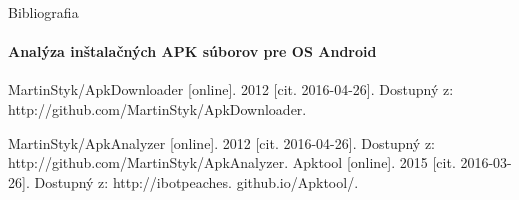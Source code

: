 \documentclass{beamer}
\begin{document}
  \begin{frame}[label=bibliography]{Bibliografia}
    \framesubtitle{Analýza inštalačných APK súborov pre OS Android}
    \begin{thebibliography}{9}
      MartinStyk/ApkDownloader [online]. 2012 [cit. 2016-04-26]. Dostupný z: http://github.com/MartinStyk/ApkDownloader.
          
                MartinStyk/ApkAnalyzer [online]. 2012 [cit. 2016-04-26]. Dostupný z: http://github.com/MartinStyk/ApkAnalyzer.
          Apktool [online]. 2015 [cit. 2016-03-26]. Dostupný z: http://ibotpeaches.
github.io/Apktool/.

    
    \end{thebibliography}
  \end{frame}
\end{document}
